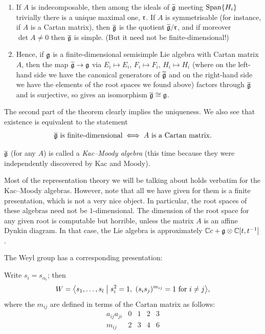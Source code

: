 \begin{theorem}\leavevmode
\begin{enumerate}
  \item If $A$ is indecomposable, then among the ideals of $\widetilde{\mathfrak{g}}$ meeting
    $\operatorname{Span}\{H_i\}$ trivially there is a unique maximal one, $\mathfrak{r}$. If $A$ is
    symmetrisable (for instance, if $A$ is a Cartan matrix), then $\overline{\mathfrak{g}}$ is
    the quotient $\widetilde{\mathfrak{g}}/\mathfrak{r}$, and if moreover $\det A \neq 0$ then $\overline{\mathfrak{g}}$ is
    simple. (But it need not be finite-dimensional!)
  \item Hence, if $\mathfrak{g}$ is a finite-dimensional semisimple Lie algebra with
    Cartan matrix $A$, then the map $\widetilde{\mathfrak{g}} \to \mathfrak{g}$ via $E_i \mapsto E_i$,
    $F_i \mapsto F_i$, $H_i \mapsto H_i$ (where on the left-hand side we have
    the canonical generators of $\widetilde{\mathfrak{g}}$ and on the right-hand side we have the
    elements of the root spaces we found above) factors through $\overline{\mathfrak{g}}$ and is
    surjective, so gives an isomorphism $\overline{\mathfrak{g}} \cong \mathfrak{g}$.
\end{enumerate}
\end{theorem}

The second part of the theorem clearly implies the uniqueness. We also see that
existence is equivalent to the statement
\[
  \overline{\mathfrak{g}} \text{ is finite-dimensional} \iff A \text{ is a Cartan matrix}.
\]

\begin{definition}
$\overline{\mathfrak{g}}$ (for any $A$) is called a \emph{Kac--Moody algebra} (this time because
they were independently discovered by Kac and Moody).
\end{definition}

Most of the representation theory we will be talking about holds verbatim for
the Kac--Moody algebras. However, note that all we have given for them is a
finite presentation, which is not a very nice object. In particular, the root
spaces of these algebras need not be $1$-dimensional. The dimension of the root
space for any given root is computable but horrible, unless the matrix $A$ is
an affine Dynkin diagram. In that case, the Lie algebra is approximately
$\mathbb{C} c + \mathfrak{g} \otimes \mathbb{C}[t, t^{-1}]$.

The Weyl group has a corresponding presentation:

\begin{theorem}
Write $s_i = s_{\alpha_i}$; then
\[
  W = \bigl\langle s_1, \dots, s_l \bigm| s_i^2 = 1,\ (s_is_j)^{m_{ij}} = 1 \text{ for } i \neq j\bigr\rangle,
\]
where the $m_{ij}$ are defined in terms of the Cartan matrix as follows:
\[
  \begin{array}{c|cccc}
    a_{ij}a_{ji} & 0 & 1 & 2 & 3\\ \hline
    m_{ij} & 2 & 3 & 4 & 6
  \end{array}
\]
\end{theorem}

